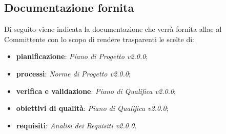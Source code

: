\subsection{Documentazione fornita}
Di seguito viene indicata la documentazione che verrà fornita allae al Committente con lo scopo di rendere trasparenti le scelte di:
\begin{itemize}
	\item \textbf{pianificazione}: \textit{Piano di Progetto v2.0.0};
	\item \textbf{processi}: \textit{Norme di Progetto v2.0.0};
	\item \textbf{verifica e validazione}: \textit{Piano di Qualifica v2.0.0};
	\item \textbf{obiettivi di qualità}: \textit{Piano di Qualifica v2.0.0};
	\item \textbf{requisiti}: \textit{Analisi dei Requisiti v2.0.0}.
\end{itemize}


